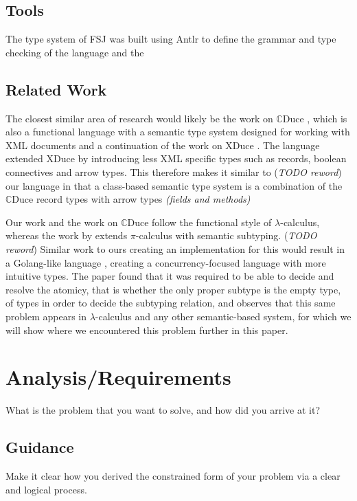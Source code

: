 \documentclass{l4proj}
\begin{document}
\section{Tools}

The type system of FSJ was built using Antlr to define the grammar and type checking of the language and the


\section{Related Work}
The closest similar area of research would likely be the work on $\mathbb{C}$Duce
\citep{Benzaken2003}, which is also a functional language with a semantic type system designed for
working with XML documents and a continuation of the work on XDuce \citep{Hosoya2003}. The language
extended XDuce by introducing less XML specific types such as records, boolean connectives and arrow
types. This therefore makes it similar to (\textit{TODO reword}) our language in that a class-based
semantic type system is a combination of the $\mathbb{C}$Duce record types with arrow types
\textit{(fields and methods)}

Our work and the work on $\mathbb{C}$Duce follow the functional style of $\lambda$-calculus,
whereas the work by \citet{Castagna2008} extends $\pi$-calculus with semantic subtyping.
(\textit{TODO reword}) Similar work to ours creating an implementation for this would result in a
Golang-like language \citep{Meyerson2014}, creating a concurrency-focused language with more
intuitive types. The paper found that it was required to be able to decide and resolve the atomicy,
that is whether the only proper subtype is the empty type, of types in order to decide the subtyping
relation, and observes that this same problem appears in $\lambda$-calculus and any other
semantic-based system, for which we will show where we encountered this problem further in this
paper.

\chapter{Analysis/Requirements}
What is the problem that you want to solve, and how did you arrive at it?
\section{Guidance}
Make it clear how you derived the constrained form of your problem via a clear and logical process.
\end{document}
